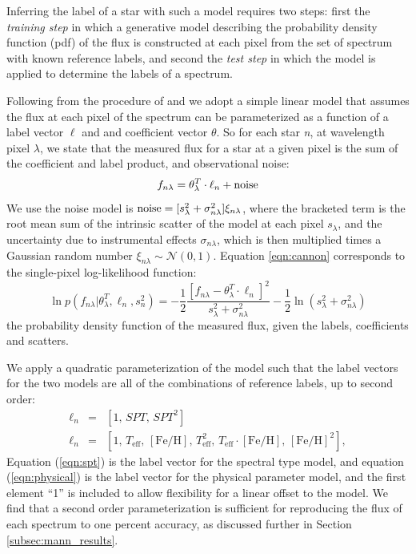 \documentclass[twocolumn]{aastex62}
\newcommand{\teff}{T_{\mathrm{eff}}}
\newcommand{\feh}{[{\mathrm{Fe}/\mathrm{H}}]}
\begin{document}
Inferring the label of a star with such a model requires two steps: first the \emph{training step} in which a generative model describing the probability density function (pdf) of the flux is constructed at each pixel from the set of spectrum with known reference labels, and second the \emph{test step} in which the model is applied to determine the labels of a spectrum.

Following from the procedure of \citealt{Ness:2015} and \citealt{Ho:2017a} we adopt a simple linear model that assumes the flux at each pixel of the spectrum can be parameterized as a function of a label vector $\ell$ and and coefficient vector \emph{$\theta$}. So for each star \emph{n}, at wavelength pixel \emph{$\lambda$}, we state that the measured flux for a star at a given pixel is the sum of the coefficient and label product, and observational noise:
\begin{equation}
	f_{n\lambda} = \theta_{\lambda}^{T} \cdot \ell_{n} + {\rm noise} \label{eqn:cannon}
\end{equation} 
We use the noise model is ${\rm noise}=[s_{\lambda}^2 + \sigma_{n\lambda}^2]\xi_{n\lambda}$, where the bracketed term is the root mean sum of the intrinsic scatter of the model at each pixel \emph{$s_{\lambda}$}, and the uncertainty due to instrumental effects \emph{$\sigma_{n\lambda}$}, which is then multiplied times a Gaussian random number $\xi_{n\lambda} \sim \mathcal{N} (0,1)$. Equation \ref{eqn:cannon} corresponds to the single-pixel log-likelihood function:
\begin{equation}
	\ln p(f_{n\lambda}|\theta^T_{\lambda}, \ell_n, s^2_n) = 
	-\frac{1}{2}\frac{[f_{n\lambda} - \theta_{\lambda}^{T} \cdot \ell_{n}]^2}{s_{\lambda}^2 + \sigma_{n\lambda}^2} - \frac{1}{2} \ln(s_{\lambda}^2 + \sigma_{n\lambda}^2) 
	\label{eqn:likelihood}
\end{equation}
the probability density function of the measured flux, given the labels, coefficients and scatters.

We apply a quadratic parameterization of the model such that the label vectors for the two models are all of the combinations of reference labels, up to second order:
\begin{eqnarray}
\ell_{n} &=& [1, \, SPT, \, SPT^{2}] \label{eqn:spt}
\\
\ell_{n} &=& [1, \, \teff, \, \feh, \, \teff^2, \, \teff \cdot \feh, \, \feh^{2}] \label{eqn:physical}
,
\end{eqnarray}
Equation (\ref{eqn:spt}) is the label vector for the spectral type model, and equation (\ref{eqn:physical}) is the label vector for the physical parameter model, and the first element ``1'' is included to allow flexibility for a linear offset to the model. We find that a second order parameterization is sufficient for reproducing the flux of each spectrum to one percent accuracy, as discussed further in Section \ref{subsec:mann_results}.
\end{document}

